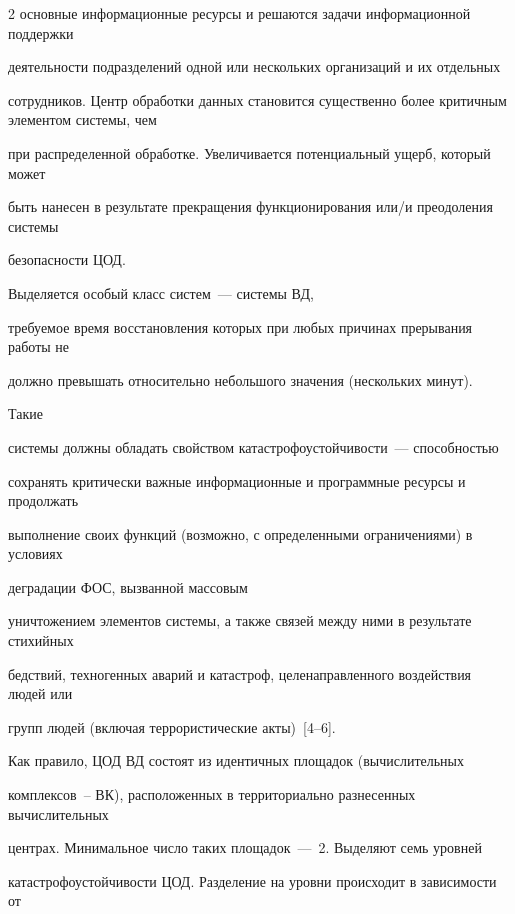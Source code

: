 \begin{multicols}{2}
основные информационные ресурсы и решаются задачи информационной поддержки 


деятельности подразделений одной или нескольких организаций и их отдельных 


сотрудников. Центр обработки данных становится существенно более критичным элементом сис\-те\-мы, чем 


при распределенной обработке. Увеличивается потенциальный ущерб, который может 


быть нанесен в результате прекращения функционирования или/и преодоления сис\-те\-мы 


безопасности ЦОД. 


       


       Выделяется особый класс сис\-тем~--- сис\-те\-мы ВД, 


требуемое время вос\-ста\-нов\-ле\-ния которых при любых причинах прерывания работы не 


должно превышать относительно небольшого значения (нескольких минут). 





Такие 


сис\-те\-мы должны \mbox{обладать} свойством ка\-та\-ст\-ро\-фо\-устой\-чи\-вости~--- спо\-соб\-ностью 


сохранять критически важные информационные и програм\-мные ресурсы и продолжать 


выполнение своих функ\-ций (возможно, с определенными ограничениями) в условиях 


деградации ФОС, вызванной массовым 


уничтожением элементов сис\-те\-мы, а также связей между ними в результате стихийных 


бедствий, техногенных аварий и катастроф, целенаправленного воздействия людей или 


групп людей (включая террористические акты)~[4--6]. 


       


       Как правило, ЦОД ВД состоят из идентичных площадок (вычислительных 


комплексов~-- ВК), расположенных в территориально разнесенных вычислительных 


центрах. Минимальное число таких площадок~---~2. Выделяют семь уровней 


катастрофоустойчивости ЦОД. Разделение на уровни происходит в зависимости от 



\end{multicols}
